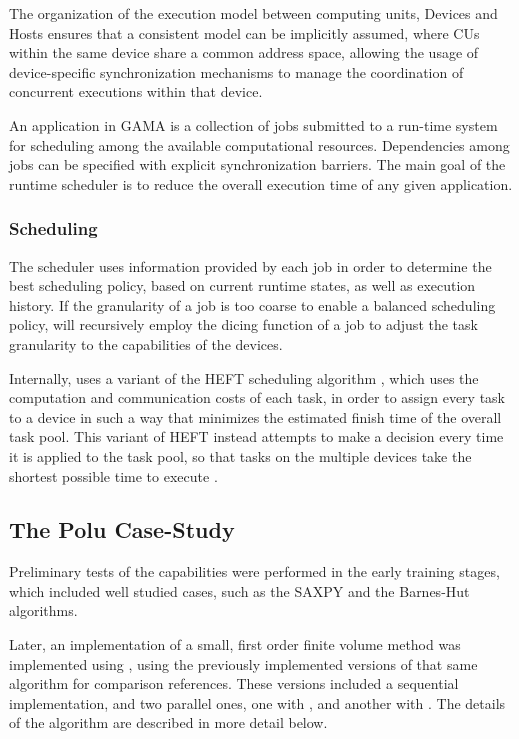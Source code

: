 \documentclass[main.tex]{subfiles}
\begin{document}
The organization of the execution model between computing units, Devices and Hosts ensures that a consistent model can be implicitly assumed, where \acsp{CU} within the same device share a common address space, allowing the usage of device-specific synchronization mechanisms to manage the coordination of concurrent executions within that device.

An application in GAMA is a collection of jobs submitted to a run-time system for scheduling among the available computational resources. Dependencies among jobs can be specified with explicit synchronization barriers. The main goal of the runtime scheduler is to reduce the overall execution time of any given application.

\subsubsection{Scheduling} \label{sec:gama_sched}

The scheduler uses information provided by each job in order to determine the best scheduling policy, based on current runtime states, as well as execution history. If the granularity of a job is too coarse to enable a balanced scheduling policy, \gama will recursively employ the dicing function of a job to adjust the task granularity to the capabilities of the devices.

Internally, \gama uses a variant of the \ac{HEFT} scheduling algorithm \cite{topcuoglu2002performance}, which uses the computation and communication costs of each task, in order to assign every task to a device in such a way that minimizes the estimated finish time of the overall task pool. This variant of \acs{HEFT} instead attempts to make a decision every time it is applied to the task pool, so that tasks on the multiple devices take the shortest possible time to execute \cite{thesisMariano12}.


\subsection{The Polu Case-Study}

Preliminary tests of the \gama capabilities were performed in the early training stages, which included well studied cases, such as the SAXPY and the Barnes-Hut algorithms.

Later, an implementation of a small, first order finite volume method was implemented using \gama, using the previously implemented versions of that same algorithm for comparison references. These versions included a sequential implementation, and two parallel ones, one with \openmp, and another with \cuda. The details of the algorithm are described in more detail below.
\end{document}
